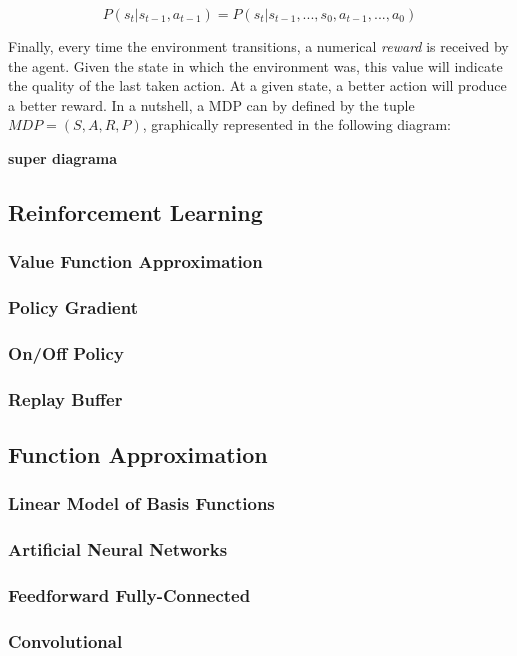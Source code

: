 \begin{equation}
    P(s_{t}|s_{t-1}, a_{t-1}) = P(s_{t}|s_{t-1},...,s_{0},a_{t-1},...,a_{0})
\end{equation}

Finally, every time the environment transitions, a numerical \emph{reward} is received by the agent.  Given the state in which the environment was, this value will indicate the quality of the last taken action. At a given state, a better action will produce a better reward. In a nutshell, a MDP can by defined by the tuple $MDP=(S,A,R,P)$, graphically represented in the following diagram:

\textbf{super diagrama}

\subsection{Reinforcement Learning}
\subsubsection{Value Function Approximation}
\subsubsection{Policy Gradient}
\subsubsection{On/Off Policy}
\subsubsection{Replay Buffer}


\subsection{Function Approximation}
\subsubsection{Linear Model of Basis Functions}
\subsubsection{Artificial Neural Networks}
\subsubsection{Feedforward Fully-Connected}
\subsubsection{Convolutional}
